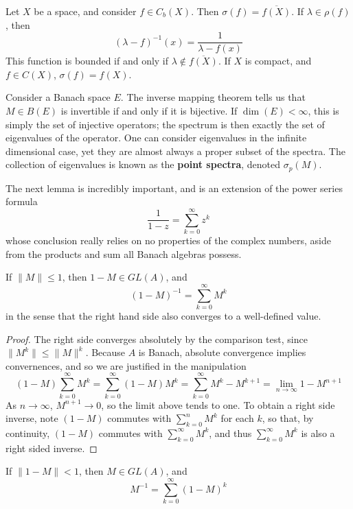 \begin{example}
    Let $X$ be a space, and consider $f \in C_b(X)$. Then $\sigma(f) = \overline{f(X)}$. If $\lambda \in \rho(f)$, then
    \[ (\lambda - f)^{-1}(x) = \frac{1}{\lambda - f(x)} \]
    This function is bounded if and only if $\lambda \not \in \overline{f(X)}$. If $X$ is compact, and $f \in C(X)$, $\sigma(f) = f(X)$.
\end{example}

\begin{example}
    Consider a Banach space $E$. The inverse mapping theorem tells us that $M \in B(E)$ is invertible if and only if it is bijective. If $\dim(E) < \infty$, this is simply the set of injective operators; the spectrum is then exactly the set of eigenvalues of the operator. One can consider eigenvalues in the infinite dimensional case, yet they are almost always a proper subset of the spectra. The collection of eigenvalues is known as the {\bf point spectra}, denoted $\sigma_p(M)$.
\end{example}

The next lemma is incredibly important, and is an extension of the power series formula
%
\[ \frac{1}{1 - z} = \sum_{k = 0}^\infty z^k \]
%
whose conclusion really relies on no properties of the complex numbers, aside from the products and sum all Banach algebras possess.

\begin{lemma}
    If $\|M\| \leq 1$, then $1 - M \in GL(A)$, and
    \[ (1 - M)^{-1} = \sum_{k = 0}^\infty M^k \]
    in the sense that the right hand side also converges to a well-defined value.
\end{lemma}
\begin{proof}
    The right side converges absolutely by the comparison test, since $\| M^k \| \leq \| M \|^k$. Because $A$ is Banach, absolute convergence implies convernences, and so we are justified in the manipulation
    \[ (1 - M) \sum_{k = 0}^\infty M^k = \sum_{k = 0}^\infty (1 - M)M^k = \sum_{k = 0}^\infty M^k - M^{k+1} = \lim_{n \to \infty} 1 - M^{n+1} \]
    As $n \to \infty$, $M^{n+1} \to 0$, so the limit above tends to one. To obtain a right side inverse, note $(1 - M)$ commutes with $\sum_{k = 0}^n M^k$ for each $k$, so that, by continuity, $(1 - M)$ commutes with $\sum_{k = 0}^\infty M^k$, and thus $\sum_{k = 0}^\infty M^k$ is also a right sided inverse.
\end{proof}

\begin{corollary}
    If $\| 1 - M \| < 1$, then $M \in GL(A)$, and
    \[ M^{-1} = \sum_{k = 0}^\infty (1 - M)^k \]
\end{corollary}

